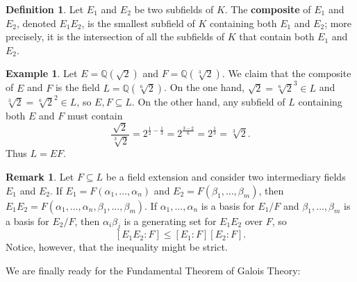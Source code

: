\documentclass[12pt]{report}
\numberwithin{equation}{section}
\numberwithin{theorem}{chapter}
\theoremstyle{definition}
\newtheorem{definition}[theorem]{Definition}
\newtheorem{example}[theorem]{Example}
\newtheorem*{basic properties}{Basic Properties}
\newtheorem*{Important Remark}{Important Remark}
\newtheorem{remark}[theorem]{Remark}
\newcommand{\Q}{\mathbb{Q}}
\begin{document}
\begin{definition}
	Let $E_1$ and $E_2$ be two subfields of $K$. The {\bf composite} of $E_1$ and $E_2$, denoted $E_1 E_2$, is the smallest subfield of $K$ containing both $E_1$ and $E_2$; more precisely, it is the intersection of all the subfields of $K$ that contain both $E_1$ and $E_2$.
\end{definition}


\begin{example}
	Let $E = \Q(\sqrt{2})$ and $F = \Q(\sqrt[3]{2})$. We claim that the composite of $E$ and $F$ is the field $L = \Q(\sqrt[6]{2})$. On the one hand, $\sqrt{2} = \sqrt[6]{2}^3 \in L$ and $\sqrt[3]{2} = \sqrt[6]{2}^2 \in L$, so $E, F \subseteq L$. On the other hand, any subfield of $L$ containing both $E$ and $F$ must contain
	$$\frac{\sqrt{2}}{\sqrt[3]{2}} = 2^{\frac{1}{2} - \frac{1}{3}} = 2^{\frac{3-2}{6}} = 2^{\frac{1}{3}} = \sqrt[3]{2}.$$
	Thus $L = EF$.
\end{example}


\begin{remark}
	Let $F \subseteq L$ be a field extension and consider two intermediary fields $E_1$ and $E_2$. If $E_1 = F(\alpha_1, \ldots, \alpha_n)$ and $E_2 = F(\beta_1, \ldots, \beta_m)$, then $E_1 E_2 = F(\alpha_1, \ldots, \alpha_n, \beta_1, \ldots, \beta_m)$. If $\alpha_1, \ldots, \alpha_n$ is a basis for $E_1/F$ and  $\beta_1, \ldots, \beta_m$ is a basis for $E_2/F$, then $\alpha_i \beta_j$ is a generating set for $E_1E_2$ over $F$, so
	$$[E_1 E_2 : F] \leqslant [E_1 : F][E_2 : F].$$
	Notice, however, that the inequality might be strict.
\end{remark}

We are finally ready for the Fundamental Theorem of Galois Theory:
\end{document}

